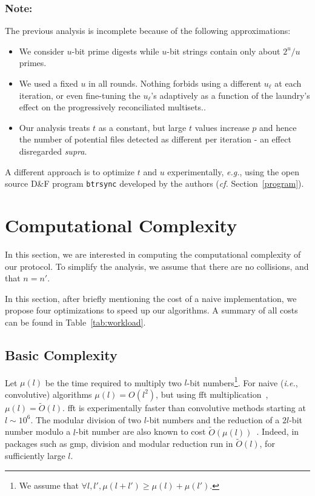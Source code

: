 \documentclass[11pt]{llncs}
\newcommand{\Oapp}{\ensuremath{\tilde{O}}}
\newcommand{\df}{D\&F\xspace}
\newcommand{\btrsync}{\texttt{btrsync}\xspace}
\newcommand{\ie}{\textit{i.e.}\xspace}
\newcommand{\cf}{\textit{cf.}\xspace}
\newcommand{\eg}{\textit{e.g.}\xspace}
\begin{document}
\subsubsection{Note:} The previous analysis is incomplete because of the following approximations:
\begin{itemize}
\item We consider $u$-bit prime digests while $u$-bit strings contain only about $2^u/u$ primes.

\item We used a fixed $u$ in all rounds. Nothing forbids using a different $u_\ell$ at each iteration, or even fine-tuning the $u_\ell$'s adaptively as a function of the laundry's effect on the progressively reconciliated multisets..

\item Our analysis treats $t$ as a constant, but large $t$ values increase $p$ and hence the number of potential files detected as different per iteration - an effect disregarded \textit{supra}.
\end{itemize}

A different approach is to optimize $t$ and $u$ experimentally, \eg, using the open source \df program \btrsync developed by the authors (\cf Section~\ref{program}).

\section{Computational Complexity}
\label{comp}
In this section, we are interested in computing the computational complexity of our protocol. 
To simplify the analysis, we assume that there are no collisions, and that $n=n'$.

In this section, after briefly mentioning the cost of a naive implementation, we propose four optimizations to speed up our algorithms.
A summary of all costs can be found in Table~\ref{tab:workload}.

\subsection{Basic Complexity}

Let $\mu(l)$ be the time required to multiply two $l$-bit numbers\footnote{We assume that $\forall l,l', \mu(l+l') \ge \mu(l) + \mu(l')$.}.
For naive (\ie, convolutive) algorithms $\mu(l) = O(l^2)$, but using {\sc fft} multiplication~\cite{schonhage1971schnelle}, $\mu(l) = \Oapp(l)$. {\sc fft} is experimentally faster than convolutive methods starting at $l \sim 10^6$.
The modular division of two $l$-bit numbers and the reduction of a $2l$-bit number modulo a $l$-bit number are also known to cost $\Oapp(\mu(l))$~\cite{burnikel1998fast}.
Indeed, in packages such as {\sf gmp}, division and modular reduction run in $\Oapp(l)$, for sufficiently large $l$.
\end{document}
